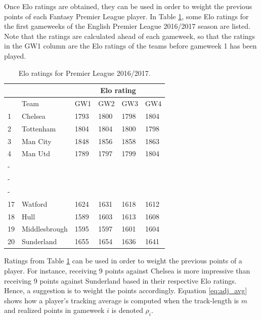 \newpar


Once Elo ratings are obtained, they can be used in order to weight the previous points of each Fantasy Premier League player. In Table \ref{Elo.1617}, some Elo ratings for the first gameweeks of the English Premier League 2016/2017 season are listed. Note that the ratings are calculated ahead of each gameweek, so that the ratings in the GW1 column are the Elo ratings of the teams before gameweek 1 has been played. 

\begin{table}[H]
\centering
\begin{tabular}{|l|l|l|l|l|l|}
\cline{2-6}
\multicolumn{1}{l|}{} & \multicolumn{1}{l|}{} & \multicolumn{4}{c|}{Elo rating}  \\ \cline{2-6} 
\hline
                      & Team                  & GW1    & GW2    & GW3  & GW4    \\
                      \hline
1                     & Chelsea               & 1793   & 1800   & 1798 & 1804   \\
2                     & Tottenham             & 1804   & 1804   & 1800 & 1798   \\
3                     & Man City              & 1848   & 1856   & 1858 & 1863   \\
4                     & Man Utd               & 1789   & 1797   & 1799 & 1804   \\
-                     &                       &        &        &      &        \\
-                     &                       &        &        &      &        \\
-                     &                       &        &        &      &        \\
17                    & Watford               & 1624   & 1631   & 1618 & 1612   \\
18                    & Hull                  & 1589   & 1603   & 1613 & 1608   \\
19                    & Middlesbrough         & 1595   & 1597   & 1601 & 1604   \\
20                    & Sunderland            & 1655   & 1654   & 1636 & 1641   \\
\hline
\end{tabular}
\caption{Elo ratings for Premier League 2016/2017.}
\label{Elo.1617}
\end{table}

Ratings from Table \ref{Elo.1617} can be used in order to weight the previous points of a player. For instance, receiving 9 points against Chelsea is more impressive than receiving 9 points against Sunderland based in their respective Elo ratings. Hence, a suggestion is to weight the points accordingly. Equation \ref{eq:adj_avg} shows how a player's tracking average is computed when the track-length is $m$ and realized points in gameweek $i$ is denoted $\rho_i$. 

